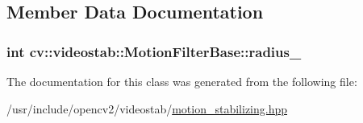\subsection{Member Data Documentation}
\hypertarget{classcv_1_1videostab_1_1MotionFilterBase_a7e72f16acda126a8a01e1b734b826834}{
\subsubsection[{radius\-\_\-}]{\setlength{\rightskip}{0pt plus 5cm}int cv\-::videostab\-::\-Motion\-Filter\-Base\-::radius\-\_\-\hspace{0.3cm}{\ttfamily [protected]}}}\label{classcv_1_1videostab_1_1MotionFilterBase_a7e72f16acda126a8a01e1b734b826834}


The documentation for this class was generated from the following file\-:\begin{DoxyCompactItemize}
\item 
/usr/include/opencv2/videostab/\hyperlink{motion__stabilizing_8hpp}{motion\-\_\-stabilizing.\-hpp}\end{DoxyCompactItemize}
